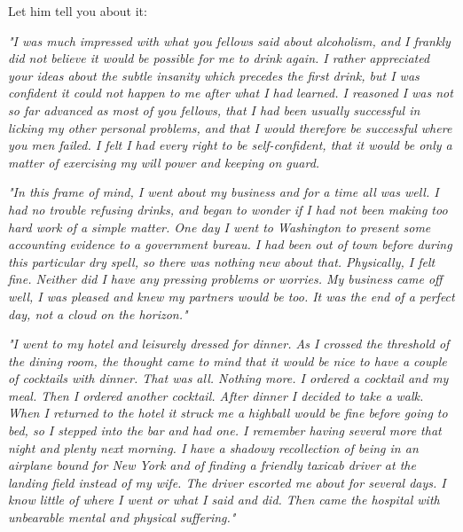 \begin{biblechapter}
    Let him tell you about it: 

\emph{
\verse "I was much impressed with what you fellows said about alcoholism, 
    and I frankly did not believe 
    it would be possible for me to drink again. 
\verse I rather appreciated your ideas 
    about the subtle insanity which precedes the first drink, 
    but I was confident it could not happen to me after what I had learned. 
\verse I reasoned I was not so far advanced as most of you fellows, 
    that I had been usually successful 
    in licking my other personal problems, 
    and that I would therefore be successful where you men failed. 
\verse I felt I had every right to be self-confident, 
    that it would be only a matter of exercising my will power 
    and keeping on guard.
}

\emph{
\verse "In this frame of mind, 
    I went about my business and for a time all was well. 
\verse I had no trouble refusing drinks, 
    and began to wonder 
    if I had not been making too hard work of a simple matter. 
\verse One day I went to Washington 
    to present some accounting evidence to a government bureau. 
\verse I had been out of town before during this particular dry spell, 
    so there was nothing new about that. 
\verse Physically, I felt fine. 
\verse Neither did I have any pressing problems or worries. 
\verse My business came off well, 
    I was pleased and knew my partners would be too. 
\verse It was the end of a perfect day, not a cloud on the horizon."
}

\emph{
\verse "I went to my hotel and leisurely dressed for dinner. 
\verse As I crossed the threshold of the dining room, 
    the thought came to mind 
    that it would be nice to have a couple of cocktails with dinner. 
\verse That was all. 
\verse Nothing more. 
\verse I ordered a cocktail and my meal. 
\verse Then I ordered another cocktail. 
\verse After dinner I decided to take a walk. 
\verse When I returned to the hotel 
    it struck me a highball would be fine before going to bed, 
    so I stepped into the bar and had one. 
\verse I remember having several more that night and plenty next morning. 
\verse I have a shadowy recollection of being in an airplane 
    bound for New York 
    and of finding a friendly taxicab driver at the landing field 
    instead of my wife. 
\verse The driver escorted me about for several days. 
\verse I know little of where I went or what I said and did. 
\verse Then came the hospital 
    with unbearable mental and physical suffering."
}


\end{biblechapter}
